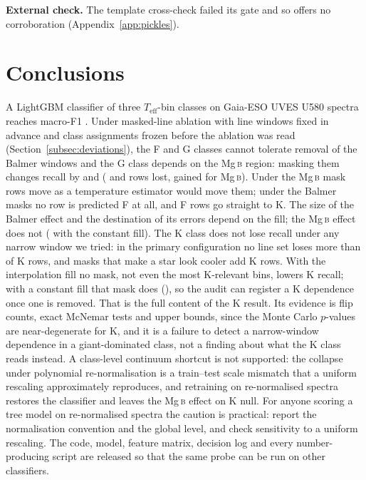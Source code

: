 \documentclass[11pt,a4paper]{article}
\newcommand{\Mgb}{Mg\,\textsc{b}\xspace}
\newcommand{\Teff}{$T_{\mathrm{eff}}$\xspace}
\begin{document}
\textbf{External check.} The template cross-check failed its gate and so offers no corroboration (Appendix~\ref{app:pickles}).

\section{Conclusions}
\label{sec:conclusions}

A LightGBM classifier of three \Teff-bin classes on Gaia-ESO UVES U580 spectra reaches macro-F1 \testMacroF. Under masked-line ablation with line windows fixed in advance and class assignments frozen before the ablation was read (Section~\ref{subsec:deviations}), the F and G classes cannot tolerate removal of the Balmer windows and the G class depends on the \Mgb region: masking them changes recall by \ablPrimHbFDelta{} and \ablPrimMgGDelta{} (\ablPrimHbFLost{} and \ablPrimMgGLost{} rows lost, \ablPrimMgGGained{} gained for \Mgb). Under the \Mgb mask rows move as a temperature estimator would move them; under the Balmer masks no row is predicted F at all, and F rows go straight to K. The size of the Balmer effect and the destination of its errors depend on the fill; the \Mgb effect does not (\ablConstMgGDelta{} with the constant fill). The K class does not lose recall under any narrow window we tried: in the primary configuration no line set loses more than \ablKMaxLost{} of \nClassK{} K rows, and masks that make a star look cooler add K rows. With the interpolation fill no mask, not even the \pcBinsTopHundred{} most K-relevant bins, lowers K recall; with a constant fill that mask does (\pcConstTopHundredKDelta), so the audit can register a K dependence once one is removed. That is the full content of the K result. Its evidence is flip counts, exact McNemar tests and upper bounds, since the Monte Carlo $p$-values are near-degenerate for K, and it is a failure to detect a narrow-window dependence in a giant-dominated class, not a finding about what the K class reads instead. A class-level continuum shortcut is not supported: the collapse under polynomial re-normalisation is a train--test scale mismatch that a uniform \sdUniMult{} rescaling approximately reproduces, and retraining on re-normalised spectra restores the classifier and leaves the \Mgb effect on K null. For anyone scoring a tree model on re-normalised spectra the caution is practical: report the normalisation convention and the global level, and check sensitivity to a uniform rescaling. The code, model, feature matrix, decision log and every number-producing script are released so that the same probe can be run on other classifiers.
\end{document}
